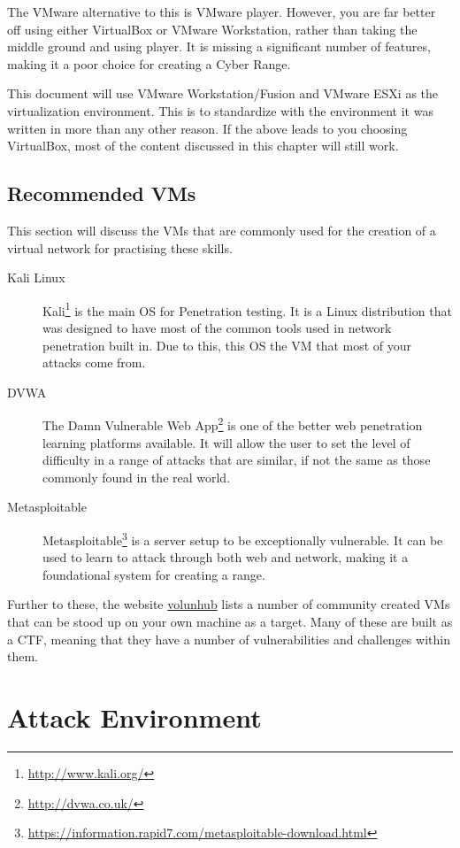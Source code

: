 			The VMware alternative to this is VMware player. 
			However, you are far better off using either VirtualBox or VMware Workstation, rather than taking the middle ground and using player. 
			It is missing a significant number of features, making it a poor choice for creating a Cyber Range. 

			This document will use VMware Workstation/Fusion and VMware ESXi as the virtualization environment. 
			This is to standardize with the environment it was written in more than any other reason. 
			If the above leads to you choosing VirtualBox, most of the content discussed in this chapter will still work. 
		
		\subsection{Recommended VMs}
			This section will discuss the VMs that are commonly used for the creation of a virtual network for practising these skills. 
			\begin{description}
				\item[Kali Linux] Kali\footnote{\url{http://www.kali.org/}} is the main OS for Penetration testing. 
					It is a Linux distribution that was designed to have most of the common tools used in network penetration built in. 
					Due to this, this OS the VM that most of your attacks come from. 
				\item[DVWA] The Damn Vulnerable Web App\footnote{\url{http://dvwa.co.uk/}} is one of the better web penetration learning platforms available. 
					It will allow the user to set the level of difficulty in a range of attacks that are similar, if not the same as those commonly found in the real world. 
				\item[Metasploitable] Metasploitable\footnote{\url{https://information.rapid7.com/metasploitable-download.html}} is a server setup to be exceptionally vulnerable. 
					It can be used to learn to attack through both web and network, making it a foundational system for creating a range. 
			\end{description}

			Further to these, the website \href{vulnhub.com}{volunhub} lists a number of community created VMs that can be stood up on your own machine as a target. 
			Many of these are built as a CTF, meaning that they have a number of vulnerabilities and challenges within them. 

	\section{Attack Environment}
